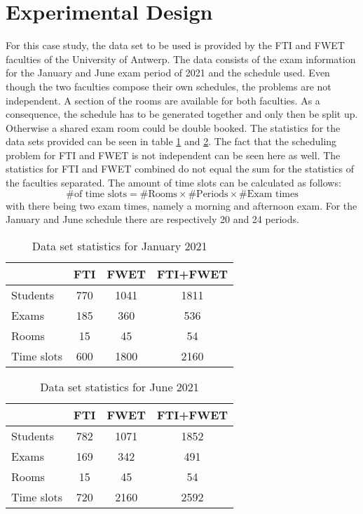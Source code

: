 \section{Experimental Design}\label{sec:experiment}

For this case study, the data set to be used is provided by the FTI and FWET faculties of the University of Antwerp. The data consists of the exam information for the January and June exam period of 2021 and the schedule used. Even though the two faculties compose their own schedules, the problems are not independent. A section of the rooms are available for both faculties. As a consequence, the schedule has to be generated together and only then be split up. Otherwise a shared exam room could be double booked. The statistics for the data sets provided can be seen in table \ref{tab:data_set_sem1} and \ref{tab:data_set_sem2}. The fact that the scheduling problem for FTI and FWET is not independent can be seen here as well. The statistics for FTI and FWET combined do not equal the sum for the statistics of the faculties separated. The amount of time slots can be calculated as follows:
\begin{equation}
    \text{\# of time slots} = \text{\# Rooms} \times \text{\# Periods} \times \text{\# Exam times}  
\end{equation}
with there being two exam times, namely a morning and afternoon exam. For the January and June schedule there are respectively 20 and 24 periods.
\begin{table}[h]
	\caption{Data set statistics for January 2021}
	\label{tab:data_set_sem1}
	\centering
	\begin{tabular}{l c c c }
		\hline
		& \textbf{FTI} & \textbf{FWET} & \textbf{FTI+FWET} \\ \hline
		Students & 770 & 1041 & 1811 \\
		Exams & 185 & 360 & 536 \\
	    Rooms & 15 & 45 & 54 \\
        Time slots & 600 & 1800 & 2160 \\ \hline
	\end{tabular}
\end{table}

\begin{table}[h]
	\caption{Data set statistics for June 2021}
	\label{tab:data_set_sem2}
	\centering
	\begin{tabular}{l c c c }
		\hline
		& \textbf{FTI} & \textbf{FWET} & \textbf{FTI+FWET} \\ \hline
		Students & 782 & 1071 & 1852 \\
		Exams & 169 & 342 & 491 \\
	    Rooms & 15 & 45 & 54 \\
        Time slots & 720 & 2160 & 2592 \\ \hline
	\end{tabular}
\end{table}

